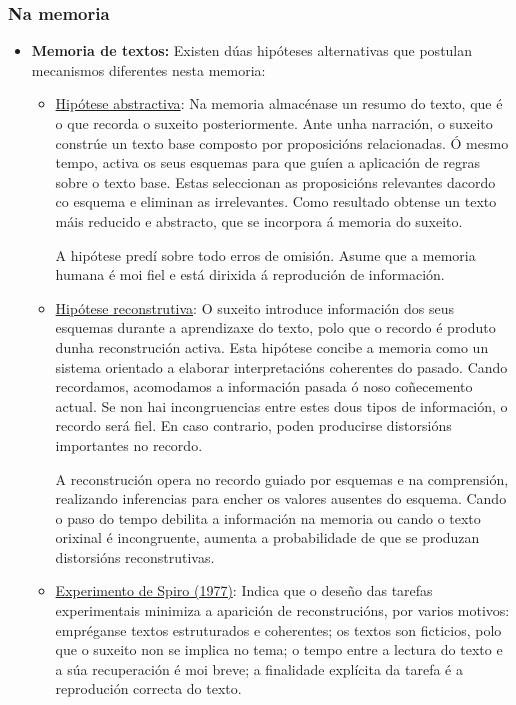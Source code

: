 \documentclass[a4paper,11pt]{article}
\begin{document}
\subsubsection{Na memoria}
\begin{itemize}
	\item \textbf{Memoria de textos:} Existen dúas hipóteses alternativas que postulan mecanismos 
	diferentes nesta memoria:
	\begin{itemize}
		\item \underline{Hipótese abstractiva}: Na memoria almacénase un resumo do texto, que é o 
		que recorda o suxeito posteriormente. Ante unha narración, o suxeito constrúe un texto base 
		composto por proposicións relacionadas. Ó mesmo tempo, activa os seus esquemas para que
		guíen a aplicación de regras sobre o texto base. Estas seleccionan as proposicións 
		relevantes dacordo co esquema e eliminan as irrelevantes. Como resultado obtense un texto 
		máis reducido e abstracto, que se incorpora á memoria do suxeito.
		
		A hipótese predí sobre todo erros de omisión. Asume que a memoria humana é moi fiel e está 
		dirixida á reprodución de información.
		\item \underline{Hipótese reconstrutiva}: O suxeito introduce información dos seus esquemas 
		durante a aprendizaxe do texto, polo que o recordo é produto dunha reconstrución activa. 
		Esta hipótese concibe a memoria como un sistema orientado a elaborar interpretacións 
		coherentes do pasado. Cando recordamos, acomodamos a información pasada ó noso coñecemento 
		actual. Se non hai incongruencias entre estes dous tipos de información, o recordo será 
		fiel. En caso contrario, poden producirse distorsións importantes no recordo. 
		
		A reconstrución opera no recordo guiado por esquemas e na comprensión, realizando 
		inferencias para encher os valores ausentes do esquema. Cando o paso do tempo debilita a 
		información na memoria ou cando o texto orixinal é incongruente, aumenta a probabilidade de 
		que se produzan distorsións reconstrutivas.
		\item \underline{Experimento de Spiro (1977)}: Indica que o deseño das tarefas experimentais 
		minimiza a aparición de reconstrucións, por varios motivos: empréganse textos estruturados e
		coherentes; os textos son ficticios, polo que o suxeito non se implica no tema; o tempo 
		entre a lectura do texto e a súa recuperación é moi breve; a finalidade explícita da tarefa 
		é a reprodución correcta do texto.
		

\end{itemize}
\end{itemize}
\end{document}
